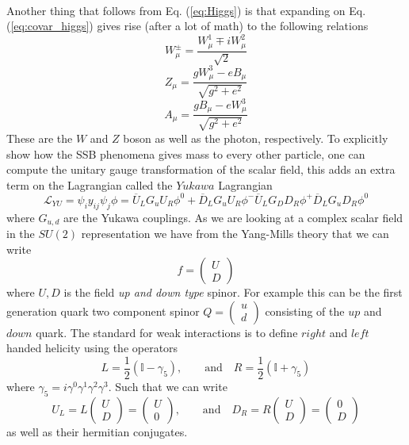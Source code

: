 \documentclass[12pt, a4paper]{book}
\begin{document}
\\Another thing that follows from Eq. (\ref{eq:Higgs}) is that expanding on Eq. (\ref{eq:covar_higgs}) gives rise (after a lot of math) to the following relations
\begin{equation}\label{eq:W_boson}
    W_\mu^\pm = \frac{W_\mu^1 \mp iW_\mu^2}{\sqrt{2}}
\end{equation}
\begin{equation}\label{eq:Z_boson}
    Z_\mu = \frac{gW_\mu^3 - eB_\mu}{\sqrt{g^2+e^2}}
\end{equation}
\begin{equation}\label{eq:photon}
    A_\mu = \frac{gB_\mu - eW_\mu^3}{\sqrt{g^2+e^2}}
\end{equation}
These are the $W$ and $Z$ boson as well as the photon, respectively. To explicitly show how the SSB phenomena gives mass to every other particle, one can compute the unitary gauge transformation of the scalar field, 
this adds an extra term on the Lagrangian called the $Yukawa$ Lagrangian
$$
\mathcal{L}_{YU} = \psi_i y_{ij}\psi_j\phi = \overline{U}_L G_u U_R \phi^0 + \overline{D}_L G_u U_R \phi^- \overline{U}_L G_D D_R \phi^+ \overline{D}_L G_u D_R \phi^0
$$
where $G_{u,d}$ are the Yukawa couplings. As we are looking at a complex scalar field in the $SU(2)$ representation we have from the Yang-Mills theory that we can write
$$
f=\begin{pmatrix}
    U\\D
\end{pmatrix}
$$
where $U,D$ is the field \textit{up and down type} spinor. For example this can be the first generation quark two component spinor $Q = \begin{pmatrix}
    u\\ d
\end{pmatrix}$ consisting of the $up$ and $down$ quark. The standard for weak interactions is to define $right$ and $left$ handed helicity using the operators 
$$
L = \frac{1}{2}(\mathbb{I} - \gamma_5),\qquad\text{and}\quad R = \frac{1}{2}(\mathbb{I} + \gamma_5)
$$
where $\gamma_{5}=i\gamma^0\gamma^1\gamma^2\gamma^3$. Such that we can write 
$$
U_L = L\begin{pmatrix}
    U\\D
\end{pmatrix} = \begin{pmatrix}
    U\\0
\end{pmatrix},\qquad\text{and}\quad D_R = R\begin{pmatrix}
    U\\D
\end{pmatrix} = \begin{pmatrix}
    0\\D
\end{pmatrix}
$$
as well as their hermitian conjugates. 
\end{document}
